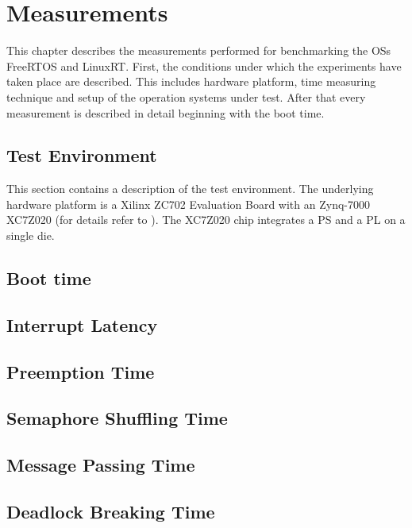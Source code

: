 \chapter{Measurements}\label{ch_measurements}
This chapter describes the measurements performed for benchmarking the \acp{OS} FreeRTOS and LinuxRT.
First, the conditions under which the experiments have taken place are described.
This includes hardware platform, time measuring technique and setup of the operation systems under test.
After that every measurement is described in detail beginning with the boot time.

\section{Test Environment}
This section contains a description of the test environment.
The underlying hardware platform is a Xilinx ZC702 Evaluation Board with an Zynq-7000 XC7Z020 (for details refer to \cite{xilinx:zc702_ev_board }).
The XC7Z020 chip integrates a \ac{PS} and a \ac{PL} on a single die.
 


\section{Boot time}
\section{Interrupt Latency}
\section{Preemption Time}
\section{Semaphore Shuffling Time}
\section{Message Passing Time}
\section{Deadlock Breaking Time}